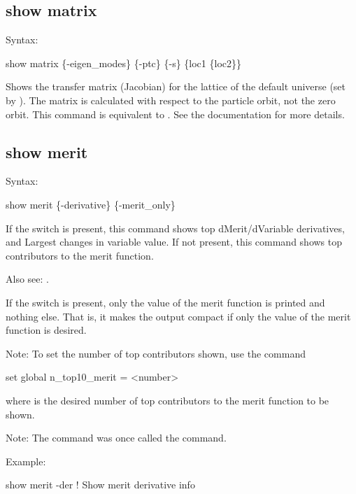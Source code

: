 {{{{{{{{%

\subsection{show matrix}
\label{s:show.matrix}

Syntax:
\begin{example}
  show matrix \{-eigen_modes\} \{-ptc\} \{-s\} \{loc1 \{loc2\}\}
\end{example}


Shows the transfer matrix (Jacobian) for the  lattice of the default universe (set by
). The matrix is calculated with respect to the particle orbit, not the
zero orbit. This command is equivalent to . See the  documentation for more details.


\subsection{show merit}
\label{s:show.merit}

Syntax:
\begin{example}
  show merit \{-derivative\} \{-merit_only\}
\end{example}

If the  switch is present, this command shows top dMerit/dVariable derivatives, and
Largest changes in variable value. If not present, this command shows top contributors to the merit
function.

Also see: .

If the  switch is present, only the value of the merit function is printed and
nothing else. That is, it makes the output compact if only the value of the merit function is
desired.

Note: To set the number of top contributors shown, use the command 
\begin{example}
  set global n_top10_merit = <number>
\end{example}
where  is the desired number of top contributors to the merit function to be shown.

Note: The  command was once called the  command.

Example:
\begin{example}
  show merit -der     ! Show merit derivative info
\end{example}

}}}}}}}}
